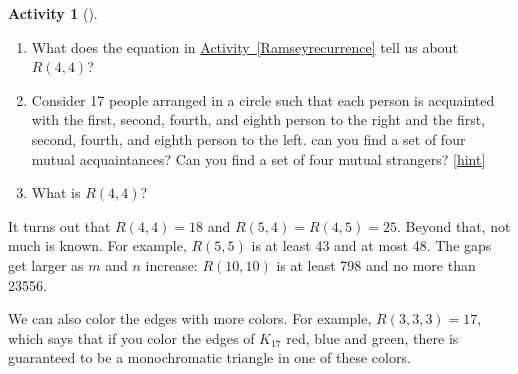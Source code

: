 \documentclass[10pt,]{book}
\theoremstyle{plain}
\theoremstyle{definition}
\theoremstyle{definition}
\theoremstyle{definition}
\newtheorem{activity}[project]{Activity}
\numberwithin{equation}{chapter}
\begin{document}
\begin{activity}[]\label{Ramseybound2}
\leavevmode%
\begin{enumerate}[font=\bfseries,label=(\alph*),ref=\alph*]
\item\label{task-58} \hypertarget{p-422}{}%
What does the equation in \hyperref[Ramseyrecurrence]{Activity~\ref{Ramseyrecurrence}} tell us about \(R(4,4)\)?%
\item\label{task-59} \hypertarget{p-424}{}%
Consider 17 people arranged in a circle such that each person is acquainted with the first, second, fourth, and eighth person to the right and the first, second, fourth, and eighth person to the left.  can you find a set of four mutual acquaintances?  Can you find a set of four mutual strangers?%
\hfill{\tiny\hyperlink{a-53.b}{[hint]}\hypertarget{q-53.b}{}}\item\label{task-60} \hypertarget{p-427}{}%
What is \(R(4,4)\)?%
\end{enumerate}
\end{activity}
\hypertarget{p-428}{}%
It turns out that \(R(4,4) = 18\) and \(R(5, 4) = R(4,5) = 25\).  Beyond that, not much is known.  For example, \(R(5,5)\) is at least 43 and at most 48.  The gaps get larger as \(m\) and \(n\) increase: \(R(10,10)\) is at least 798 and no more than 23556.%
\par
\hypertarget{p-429}{}%
We can also color the edges with more colors.  For example, \(R(3,3,3) = 17\), which says that if you color the edges of \(K_{17}\) red, blue and green, there is guaranteed to be a monochromatic triangle in one of these colors.%
\typeout{************************************************}
\typeout{************************************************}
\end{document}
